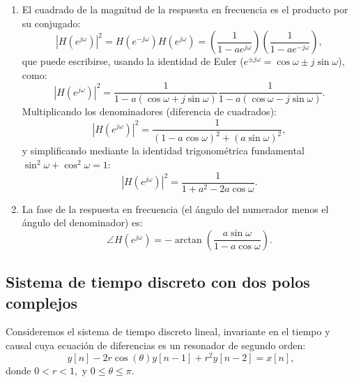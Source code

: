 \begin{enumerate}
	\item El cuadrado de la magnitud de la respuesta en frecuencia es el producto por su conjugado:
	\begin{equation}
		|H(e^{j\omega})|^2 = H(e^{-j\omega}) H(e^{j\omega}) = \left(\frac{1}{1 - a e^{j\omega}}\right) \left(\frac{1}{1 - a e^{-j\omega}}\right),
	\end{equation}
	que puede escribirse, usando la identidad de Euler ($e^{\pm j\omega} = \cos\omega \pm j\sin\omega$), como:
	\begin{equation}
		|H(e^{j\omega})|^2 = \frac{1}{1 - a(\cos\omega + j\sin\omega)} \frac{1}{1 - a(\cos\omega - j\sin\omega)}.
	\end{equation}
	Multiplicando los denominadores (diferencia de cuadrados):
	\begin{equation}
		|H(e^{j\omega})|^2 = \frac{1}{(1 - a\cos\omega)^{2} + (a\sin\omega)^{2}},
	\end{equation}
	y simplificando mediante la identidad trigonométrica fundamental $\sin^2\omega + \cos^2\omega = 1$:
	\begin{equation}
		|H(e^{j\omega})|^2 = \frac{1}{1 + a^{2} - 2a\cos\omega}.
	\end{equation}
	
	\item La fase de la respuesta en frecuencia (el ángulo del numerador menos el ángulo del denominador) es:
	\begin{equation}
		\angle H(e^{j\omega}) = -\arctan \left( \frac{a\sin\omega}{1 - a\cos\omega} \right).
	\end{equation}
\end{enumerate}

\subsection{Sistema de tiempo discreto con dos polos complejos}

Consideremos el sistema de tiempo discreto lineal, invariante en el tiempo y causal cuya ecuaci\'{o}n de diferencias es un resonador de segundo orden:
\begin{equation}
	y[n] - 2r\cos(\theta) y[n-1] + r^{2} y[n-2] = x[n],
\end{equation}
donde $0 < r < 1,$ y $0 \leq \theta \leq \pi.$

